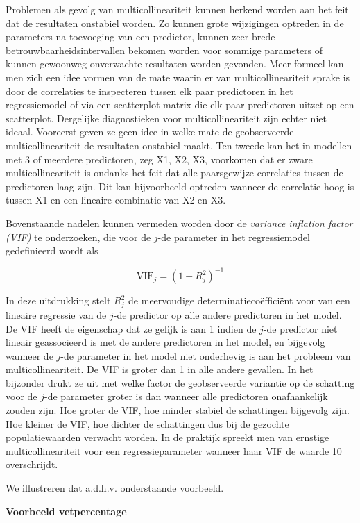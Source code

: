 \documentclass[
  12pt,dutch,coursenotes]{book}
\theoremstyle{definition}
\theoremstyle{definition}
\theoremstyle{definition}
\theoremstyle{remark}
\begin{document}
Problemen als gevolg van multicollineariteit kunnen herkend worden aan het feit dat de resultaten onstabiel worden. Zo kunnen grote wijzigingen optreden in de parameters na toevoeging van een predictor, kunnen zeer brede betrouwbaarheidsintervallen bekomen worden voor sommige parameters of kunnen gewoonweg onverwachte resultaten worden gevonden. Meer formeel kan men zich een idee vormen van de mate waarin er van multicollineariteit sprake is door de correlaties te inspecteren tussen elk paar predictoren in het regressiemodel of via een scatterplot matrix die elk paar predictoren uitzet op een scatterplot.
Dergelijke diagnostieken voor multicollineariteit zijn echter niet ideaal.
Vooreerst geven ze geen idee in welke mate de geobserveerde multicollineariteit de resultaten onstabiel maakt.
Ten tweede kan het in modellen met 3 of meerdere predictoren, zeg X1, X2, X3, voorkomen dat er zware multicollineariteit is ondanks het feit dat alle paarsgewijze correlaties tussen de predictoren laag zijn.
Dit kan bijvoorbeeld optreden wanneer de correlatie hoog is tussen X1 en een lineaire combinatie van X2 en X3.

Bovenstaande nadelen kunnen vermeden worden door de \textit{variance inflation factor (VIF)} te onderzoeken, die voor de \(j\)-de parameter in het regressiemodel gedefinieerd wordt als

\[
\textrm{VIF}_j=\left(1-R_j^2\right)^{-1}
\]

In deze uitdrukking stelt \(R_j^2\) de meervoudige determinatiecoëfficiënt voor van een lineaire regressie van de \(j\)-de predictor op alle andere predictoren in het model. De VIF heeft de eigenschap dat ze gelijk is aan 1 indien de \(j\)-de predictor niet lineair geassocieerd is met de andere predictoren in het model, en bijgevolg wanneer de \(j\)-de parameter in het model niet onderhevig is aan het probleem van multicollineariteit. De VIF is groter dan 1 in alle andere gevallen. In het bijzonder drukt ze uit met welke factor de geobserveerde variantie op de schatting voor de \(j\)-de parameter groter is dan wanneer alle predictoren onafhankelijk zouden zijn. Hoe groter de VIF, hoe minder stabiel de schattingen bijgevolg zijn. Hoe kleiner de VIF, hoe dichter de schattingen dus bij de gezochte populatiewaarden verwacht worden. In de praktijk spreekt men van ernstige multicollineariteit voor een regressieparameter wanneer haar VIF de waarde 10 overschrijdt.

We illustreren dat a.d.h.v. onderstaande voorbeeld.

\textbf{Voorbeeld vetpercentage}
\end{document}
